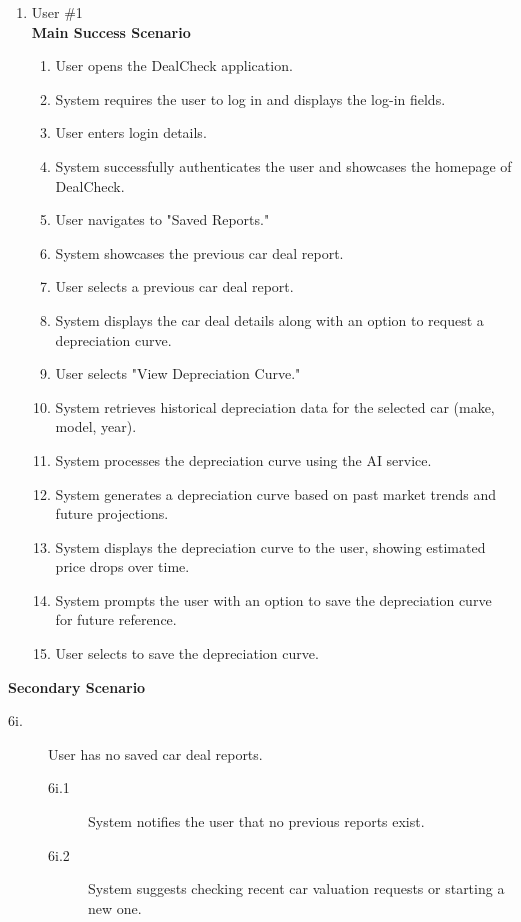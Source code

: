 \documentclass[]{article}
\begin{document}
\begin{enumerate}[{\bf {BE}1.}]
	\begin{enumerate}[{\bf VP1.}]
		\item User \#1 \\
		{\bf Main Success Scenario}
		\begin{enumerate}[1.]
			\item User opens the DealCheck application.
			\item System requires the user to log in and displays the log-in fields.
			\item User enters login details.
			\item System successfully authenticates the user and showcases the homepage of DealCheck.
			\item User navigates to "Saved Reports."
			\item System showcases the previous car deal report.
			\item User selects a previous car deal report.
			\item System displays the car deal details along with an option to request a depreciation curve.
			\item User selects "View Depreciation Curve."
			\item System retrieves historical depreciation data for the selected car (make, model, year).
			\item System processes the depreciation curve using the AI service.
			\item System generates a depreciation curve based on past market trends and future projections.
			\item System displays the depreciation curve to the user, showing estimated price drops over time.
			\item System prompts the user with an option to save the depreciation curve for future reference.
			\item User selects to save the depreciation curve.
		\end{enumerate}
	\end{enumerate}
		{\bf Secondary Scenario}
		\begin{description}
			\item[6i.] User has no saved car deal reports.
			\begin{description}
				\item[6i.1] System notifies the user that no previous reports exist.
				\item[6i.2] System suggests checking recent car valuation requests or starting a new one.
			\end{description}
			

\end{description}
\end{enumerate}
\end{document}
